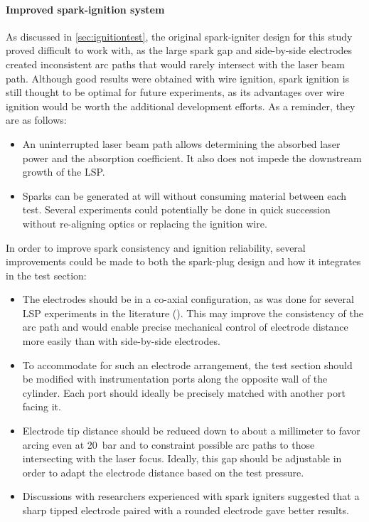         \paragraph{Improved spark-ignition system} As discussed in \autoref{sec:ignitiontest}, the original spark-igniter design for this study proved difficult to work with, as the large spark gap and side-by-side electrodes created inconsistent arc paths that would rarely intersect with the laser beam path. Although good results were obtained with wire ignition, spark ignition is still thought to be optimal for future experiments, as its advantages over wire ignition would be worth the additional development efforts. As a reminder, they are as follows:
        \begin{itemize}
            \item An uninterrupted laser beam path allows determining the absorbed laser power and the absorption coefficient. It also does not impede the downstream growth of the LSP.
            \item Sparks can be generated at will without consuming material between each test. Several experiments could potentially be done in quick succession without re-aligning optics or replacing the ignition wire.
        \end{itemize}
        In order to improve spark consistency and ignition reliability, several improvements could be made to both the spark-plug design and how it integrates in the test section:
        \begin{itemize}
            \item The electrodes should be in a co-axial configuration, as was done for several LSP experiments in the literature (\textcite{luCharacteristicDiagnosticsLaserStabilized2022, zimakovInteractionNearIRLaser2016,matsuiGeneratingConditionsArgon2019}). This may improve the consistency of the arc path and would enable precise mechanical control of electrode distance more easily than with side-by-side electrodes.
            \item To accommodate for such an electrode arrangement, the test section should be modified with instrumentation ports along the opposite wall of the cylinder. Each port should ideally be precisely matched with another port facing it.
            \item Electrode tip distance should be reduced down to about a millimeter to favor arcing even at \qty{20}{bar} and to constraint possible arc paths to those intersecting with the laser focus. Ideally, this gap should be adjustable in order to adapt the electrode distance based on the test pressure.
            \item Discussions with researchers experienced with spark igniters suggested that a sharp tipped electrode paired with a rounded electrode gave better results.
        \end{itemize}

